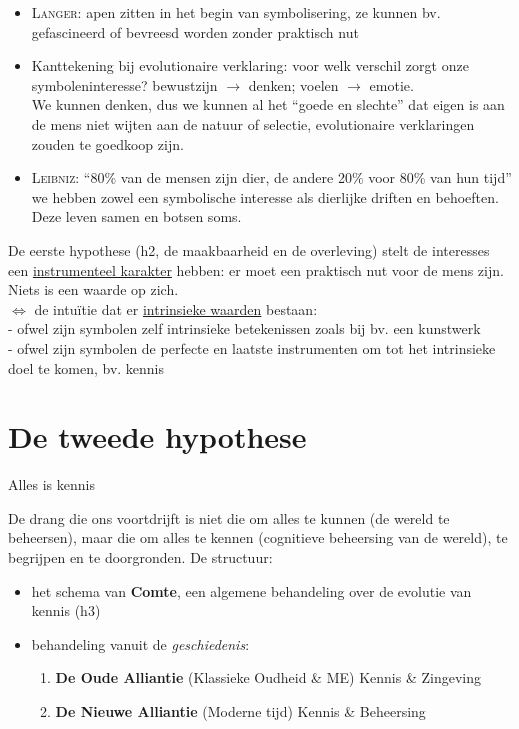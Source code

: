 \begin{itemize}
\item \textsc{Langer}: apen zitten in het begin van symbolisering, ze kunnen bv. gefascineerd of bevreesd worden zonder praktisch nut
\item Kanttekening bij evolutionaire verklaring: voor welk verschil zorgt onze symboleninteresse? bewustzijn $\rightarrow$ denken; voelen $\rightarrow$ emotie. \\ We kunnen denken, dus we kunnen al het ``goede en slechte'' dat eigen is aan de mens niet wijten aan de natuur of selectie, evolutionaire verklaringen zouden te goedkoop zijn.
\item \textsc{Leibniz}: ``80\% van de mensen zijn dier, de andere 20\% voor 80\% van hun tijd'' we hebben zowel een symbolische interesse als dierlijke driften en behoeften. Deze leven samen en botsen soms.

\end{itemize}
De eerste hypothese (h2, de maakbaarheid en de overleving) stelt de interesses een \underline{instrumenteel karakter} hebben: er moet een praktisch nut voor de mens zijn. Niets is een waarde op zich.
\\
$\Leftrightarrow$ de intu\"itie dat er \underline{intrinsieke waarden} bestaan: \\ - ofwel zijn symbolen zelf intrinsieke betekenissen zoals bij bv. een kunstwerk \\ - ofwel zijn symbolen de perfecte en laatste instrumenten om tot het intrinsieke doel te komen, bv. kennis
\section{De tweede hypothese}
\begin{center}
\begin{huge}
Alles is kennis
\end{huge}
\end{center}
De drang die ons voortdrijft is niet die om alles te kunnen (de wereld te beheersen), maar die om alles te kennen (cognitieve beheersing van de wereld), te begrijpen en te doorgronden. De structuur:
\begin{itemize}
\item het schema van \textbf{Comte}, een algemene behandeling over de evolutie van kennis (h3)
\item behandeling vanuit de \emph{geschiedenis}:
	\begin{enumerate}
	\item \textbf{De Oude Alliantie} (Klassieke Oudheid \& ME) Kennis \& Zingeving 
	\item \textbf{De Nieuwe Alliantie} (Moderne tijd) Kennis \& Beheersing
	\end{enumerate}
	
\end{itemize}
